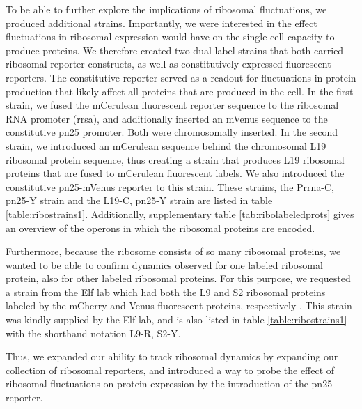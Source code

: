 To be able to further explore the implications of ribosomal fluctuations, 
we produced additional strains.
%
Importantly, we were interested in the effect fluctuations in ribosomal expression would have on 
the single cell capacity to produce proteins.
%
We therefore created two dual-label strains that both carried ribosomal reporter constructs, as well as constitutively expressed fluorescent reporters.
%
The constitutive reporter served as a readout for fluctuations in protein production that likely affect all proteins that are produced in the cell. 
%
In the first strain, we fused the mCerulean fluorescent reporter sequence to the ribosomal RNA promoter (rrsa), and additionally inserted an mVenus sequence to the constitutive pn25 promoter. Both were chromosomally inserted.
%
In the second strain, we introduced an mCerulean sequence behind the chromosomal L19 ribosomal protein sequence, thus creating a strain that produces L19 ribosomal proteins that are fused to mCerulean fluorescent labels.
We also introduced the constitutive pn25-mVenus reporter to this strain.
%
These strains, the Prrna-C, pn25-Y strain and the L19-C, pn25-Y strain are listed in table \ref{table:ribostrains1}.
Additionally, supplementary table \ref{tab:ribolabeledprots} gives an overview of the operons in which the ribosomal proteins are encoded.

Furthermore, because the ribosome consists of so many ribosomal proteins, we wanted to be able to confirm 
dynamics observed for one labeled ribosomal protein, also for other labeled ribosomal proteins.
%
For this purpose, we requested a strain from the Elf lab which had both the L9 and S2 ribosomal proteins labeled by the mCherry and Venus fluorescent proteins, respectively \cite{Wallden2016}.
This strain was kindly supplied by the Elf lab, and is also listed in table \ref{table:ribostrains1} with the shorthand notation L9-R, S2-Y.

Thus, we expanded our ability to track ribosomal dynamics by 
expanding our collection of ribosomal reporters, 
and introduced a way to probe the effect of ribosomal fluctuations on protein expression by the introduction of the pn25 reporter.


